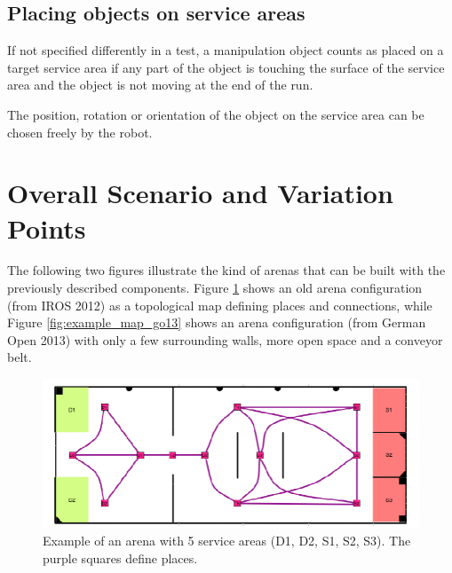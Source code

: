\subsection{Placing objects on service areas}
If not specified differently in a test, a manipulation object counts as placed on a target service area if any part of the object is touching the surface of the service area and the object is not moving at the end of the run.
\par
The position, rotation or orientation of the object on the service area can be chosen freely by the robot.

\section{Overall Scenario and Variation Points}
The following two figures illustrate the kind of arenas that can be built with the previously described components. Figure \ref{fig:example_map} shows an old arena configuration (from IROS 2012) as a topological map defining places and connections, while Figure \ref{fig:example_map_go13} shows an arena configuration (from German Open 2013) with only a few surrounding walls, more open space and a conveyor belt.

\begin{figure}
\includegraphics[width= \textwidth ]{../images/example_map.png}
\caption{Example of an arena with 5 service areas (D1, D2, S1, S2, S3). The purple squares define places.}
\label{fig:example_map}
\end{figure}


